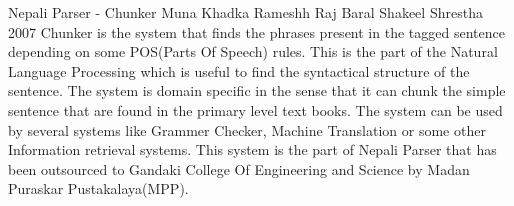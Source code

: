  \begin{conf-abstract}[]
{Nepali Parser - Chunker}
{
Muna Khadka
Rameshh Raj Baral
Shakeel Shrestha
}
{2007}
Chunker is the system that finds the phrases present in the tagged sentence
depending on some POS(Parts Of Speech) rules. This is the part of the Natural
Language Processing which is useful to find the syntactical structure of the
sentence. The system is domain specific in the sense that it can chunk the simple
sentence that are found in the primary level text books. The system can be used
by several systems like Grammer Checker, Machine Translation or some other 
Information retrieval systems. This system is the part of Nepali Parser that has
been outsourced to Gandaki College Of Engineering and Science by Madan Puraskar 
Pustakalaya(MPP).
  \end{conf-abstract}